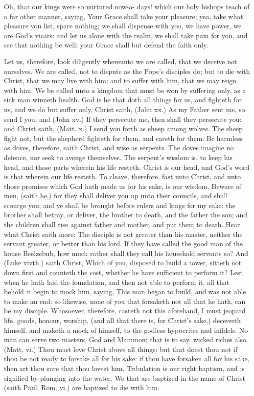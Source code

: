 Oh, that our kings were so nurtured now-a- 
days! which our holy bishops teach of a far 
other manner, saying, Your Grace shall take 
your pleasure; yea, take what pleasure you list, 
spare nothing; we shall dispense with you, we 
have power, we are God's vicars: and let us 
alone with the realm, we shall take pain for you, 
and see that nothing be well: your Grace shall 
but defend the faith only. 

Let us, therefore, look diligently whereunto 
we are called, that we deceive not ourselves. 
We are called, not to dispute as the Pope's disciples
do; but to die with Christ, that we may 
live with him; and to suffer with him, that we 
may reign with him. We be called unto a kingdom
that must be won by suffering only, as a 
sick man winneth health. God is he that doth all 
things for us, and fighteth for us, and we do but 
suffer only, Christ saith, (John xx.) As my Father 
sent me, so send I you; and (John xv.) If they 
persecute me, then shall they persecute you:
and Christ saith, (Matt. x.) I send you forth as 
sheep among wolves. The sheep fight not, but 
the shepherd fighteth for them, and careth for 
them. Be harmless as doves, therefore, saith 
Christ, and wise as serpents. The doves imagine
no defence, nor seek to avenge themselves.
The serpent's wisdom is, to keep his 
head, and those parts wherein his life resteth.
Christ is our head, and God's word is that 
wherein our life resteth. To cleave, therefore, 
fast unto Christ, and unto those promises which 
God hath made us for his sake, is our wisdom. 
Beware of men, (saith he,) for they shall deliver 
you up unto their councils, and shall scourge 
you; and ye shall be brought before rulers and 
kings for my sake: the brother shall betray, or 
deliver, the brother to death, and the father the 
son; and the children shall rise against father 
and mother, and put them to death. Hear what 
Christ saith more: The disciple is not greater 
than his master, neither the servant greater, or 
better than his lord. If they have called the 
good man of the house Beelzebub, how much 
rather shall they call his household servants so? 
And (Luke xivth.) saith Christ, Which of you, 
disposed to build a tower, sitteth not down first 
and counteth the cost, whether he have sufficient 
to perform it? Lest when he hath laid the foundation,
and then not able to perform it, all that 
behold it begin to mock him, saying, This man 
began to build, and was not able to make an 
end: so likewise, none of you that forsaketh not 
all that he hath, can be my disciple. Whosoever,
therefore, casteth not this aforehand, I must 
jeopard life, goods, honour, worship, (and all 
that there is, for Christ's sake,) deceiveth himself,
and maketh a mock of himself, to the godless
hypocrites and infidels. No man can serve 
two masters, God and Mammon; that is to say, 
wicked riches also. (Matt. vi.) Thou must love 
Christ above all things: but that doest thou 
not if thou be not ready to forsake all for his 
sake: if thou have forsaken all for his sake, then 
art thou sure that thou lovest him. Tribulation
is our right baptism, and is signified by plunging 
into the water. We that are baptized in the 
name of Christ (saith Paul, Rom. vi.) are baptized
to die with him. 

